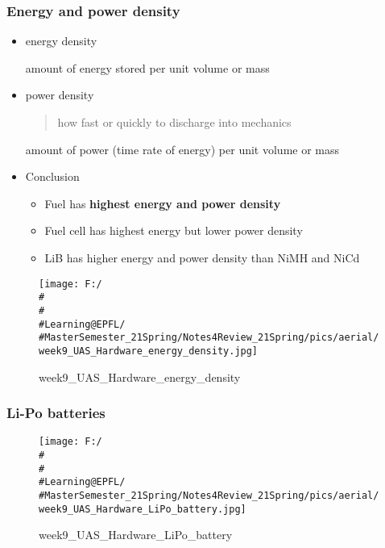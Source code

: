 \documentclass[]{article}
\begin{document}
\subsubsection{Energy and power density}\label{header-n1956}

\begin{itemize}
\item
  energy density

  amount of energy stored per unit volume or mass
\item
  power density

  \begin{quote}
  how fast or quickly to discharge into mechanics
  \end{quote}

  amount of power (time rate of energy) per unit volume or mass
\item
  Conclusion

  \begin{itemize}
  \item
    Fuel has \textbf{highest energy and power density}
  \item
    Fuel cell has highest energy but lower power density
  \item
    LiB has higher energy and power density than NiMH and NiCd
  \end{itemize}
\end{itemize}

\begin{figure}
\centering
\texttt{[image: F:/\\\#\\\#\\\#Learning@EPFL/\\\#MasterSemester\_21Spring/Notes4Review\_21Spring/pics/aerial/week9\_UAS\_Hardware\_energy\_density.jpg]}
\caption{week9\_UAS\_Hardware\_energy\_density}
\end{figure}

\subsubsection{Li-Po batteries}\label{header-n1976}

\begin{figure}
\centering
\texttt{[image: F:/\\\#\\\#\\\#Learning@EPFL/\\\#MasterSemester\_21Spring/Notes4Review\_21Spring/pics/aerial/week9\_UAS\_Hardware\_LiPo\_battery.jpg]}
\caption{week9\_UAS\_Hardware\_LiPo\_battery}
\end{figure}
\end{document}

